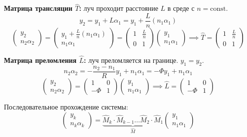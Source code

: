 \textbf{Матрица трансляции $\hat{T}$:} луч проходит расстояние $L$ в среде с $n = \text{const}$.
\begin{equation*}
	y_2 = y_1 + L\alpha_1 = y_1 + \frac{L}{n} (n_1\alpha_1)
\end{equation*}
\begin{equation*}
	\begin{pmatrix} y_2 \\ n_2\alpha_2 \end{pmatrix} = \begin{pmatrix} y_1 + \frac{L}{n} (n_1\alpha_1) \\ n_1\alpha_1 \end{pmatrix} = \begin{pmatrix} 1 & \frac{L}{n} \\ 0 & 1 \end{pmatrix} \begin{pmatrix} y_1 \\ n_1\alpha_1 \end{pmatrix} \implies \hat{T} = \begin{pmatrix} 1 & \frac{L}{n} \\ 0 & 1 \end{pmatrix}
\end{equation*}

\textbf{Матрица преломления $\hat{L}$:} луч преломляется на границе. $y_1 = y_2$.
\begin{equation*}
	n_2\alpha_2 = - \frac{n_2 - n_1}{R} y_1 + n_1\alpha_1 = -\Phi y_1 + n_1\alpha_1
\end{equation*}
\begin{equation*}
	\begin{pmatrix} y_2 \\ n_2\alpha_2 \end{pmatrix} = \begin{pmatrix} 1 & 0 \\ -\Phi & 1 \end{pmatrix} \begin{pmatrix} y_1 \\ n_1\alpha_1 \end{pmatrix} \implies \hat{L} = \begin{pmatrix} 1 & 0 \\ -\Phi & 1 \end{pmatrix}
\end{equation*}

Последовательное прохождение системы:
\begin{equation*}
	\begin{pmatrix} y_k \\ n_k \alpha_k \end{pmatrix} = \underbrace{\hat{M}_k \cdot \hat{M}_{k-1} \dots \hat{M}_2 \cdot \hat{M}_1}_{\hat{M}} \begin{pmatrix} y_1 \\ n_1 \alpha_1 \end{pmatrix}
\end{equation*}

